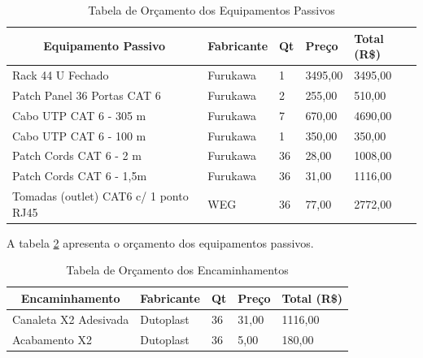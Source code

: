 \documentclass[	DIV=calc,%
							paper=a4,%
							fontsize=12pt,%
							onecolumn]{scrartcl}	 					%
\begin{document}
\begin{table}[]
	\begin{tabular}{|l|l|l|l|l|}
		\hline
		\multicolumn{1}{|c|}{\textbf{Equipamento Passivo}} & \multicolumn{1}{c|}{\textbf{Fabricante}} & \multicolumn{1}{c|}{\textbf{Qt}} & \textbf{Preço} & \textbf{Total (R\$)} \\ \hline
		Rack 44 U Fechado                                  & Furukawa                                 & 1                                & 3495,00        & 3495,00              \\ \hline
		Patch Panel 36 Portas CAT 6                        & Furukawa                                 & 2                                & 255,00         & 510,00               \\ \hline
		Cabo UTP CAT 6 - 305 m                             & Furukawa                                 & 7                                & 670,00         & 4690,00              \\ \hline
		Cabo UTP CAT 6 - 100 m                             & Furukawa                                 & 1                                & 350,00         & 350,00               \\ \hline
		Patch Cords CAT 6 - 2 m                            & Furukawa                                 & 36                               & 28,00          & 1008,00              \\ \hline
		Patch Cords CAT 6 - 1,5m                           & Furukawa                                 & 36                               & 31,00          & 1116,00              \\ \hline
		Tomadas (outlet) CAT6 c/ 1 ponto RJ45              & WEG                                      & 36                               & 77,00          & 2772,00              \\ \hline
	\end{tabular}
\caption{Tabela de Orçamento dos Equipamentos Passivos}
\label{tab:orcPassivos}
\end{table}

A tabela \ref{tab:orcEncaminhamentos} apresenta o orçamento dos equipamentos passivos.

\begin{table}[]
	\begin{tabular}{|l|l|l|l|l|}
		\hline
		\multicolumn{1}{|c|}{\textbf{Encaminhamento}} & \multicolumn{1}{c|}{\textbf{Fabricante}} & \multicolumn{1}{c|}{\textbf{Qt}} & \textbf{Preço} & \textbf{Total (R\$)} \\ \hline
		Canaleta X2 Adesivada                         & Dutoplast                                & 36                               & 31,00          & 1116,00              \\ \hline
		Acabamento X2                                 & Dutoplast                                & 36                               & 5,00           & 180,00               \\ \hline
	\end{tabular}
	\caption{Tabela de Orçamento dos Encaminhamentos}
	\label{tab:orcEncaminhamentos}
\end{table}
\end{document}

